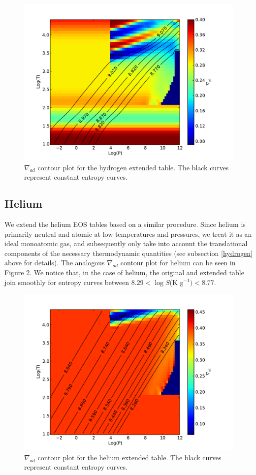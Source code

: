 \documentclass[apj]{emulateapj}
\begin{document}
\begin{figure}[h!]
\centering
\includegraphics[scale=.5]{../figs/EOS/delad_H_ext}
\caption{$\nabla_{ad}$ contour plot for the hydrogen extended table. The black curves represent constant entropy curves.}
\end{figure}

\subsection{Helium}

We extend the helium EOS tables based on a similar procedure. Since helium is primarily neutral and atomic at low temperatures and pressures, we treat it as an ideal monoatomic gas, and subsequently only take into account the translational components of the necessary thermodynamic quantities (see subsection \ref{hydrogen} above for details). The analogous $\nabla_{ad}$ contour plot for helium can be seen in Figure 2. We notice that, in the case of helium, the original and extended table join smoothly for entropy curves between $8.29<\log{S}$(K g$^{-1})<8.77$.

\begin{figure}[h!]
\centering
\includegraphics[scale=.5]{../figs/EOS/delad_He_ext}
\caption{$\nabla_{ad}$ contour plot for the helium extended table. The black curves represent constant entropy curves.}
\end{figure}
\end{document}
